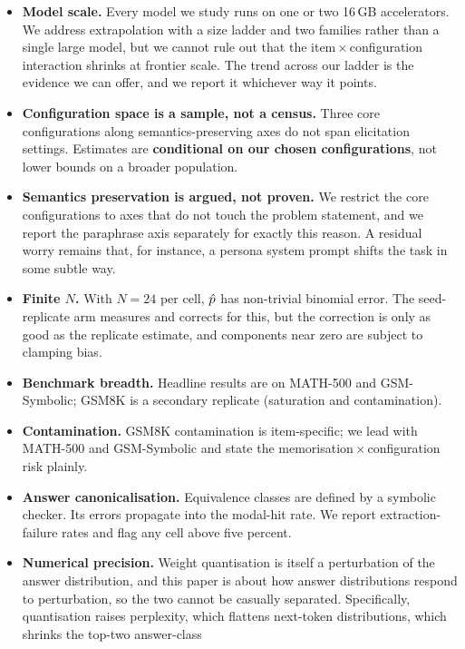 \begin{itemize}\itemsep2pt
  \item \textbf{Model scale.} Every model we study runs on one or two 16\,GB
    accelerators. We address extrapolation with a size ladder and two families
    rather than a single large model, but we cannot rule out that the
    item\,$\times$\,configuration interaction shrinks at frontier scale. The
    trend across our ladder is the evidence we can offer, and we report it
    whichever way it points.
  \item \textbf{Configuration space is a sample, not a census.} Three core
    configurations along semantics-preserving axes do not span elicitation settings. Estimates
    are \textbf{conditional on our chosen configurations}, not lower bounds on a
    broader population.
  \item \textbf{Semantics preservation is argued, not proven.} We restrict the
    core configurations to axes that do not touch the problem statement, and we
    report the paraphrase axis separately for exactly this reason. A residual
    worry remains that, for instance, a persona system prompt shifts the task
    in some subtle way.
  \item \textbf{Finite $N$.} With $N{=}24$ per cell, $\hat{p}$ has non-trivial
    binomial error. The seed-replicate arm measures and corrects for this, but
    the correction is only as good as the replicate estimate, and components
    near zero are subject to clamping bias.
  \item \textbf{Benchmark breadth.} Headline results are on MATH-500 and
    GSM-Symbolic; GSM8K is a secondary replicate (saturation and contamination).
  \item \textbf{Contamination.} GSM8K contamination is item-specific; we lead
    with MATH-500 and GSM-Symbolic and state the memorisation\,$\times$\,configuration
    risk plainly.
  \item \textbf{Answer canonicalisation.} Equivalence classes are defined by a
    symbolic checker. Its errors propagate into the modal-hit rate. We report
    extraction-failure rates and flag any cell above five percent.
  \item \textbf{Numerical precision.} Weight quantisation is itself a
    perturbation of the answer distribution, and this paper is about how
    answer distributions respond to perturbation, so the two cannot be
    casually separated. Specifically, quantisation raises perplexity, which
    flattens next-token distributions, which shrinks the top-two answer-class

\end{itemize}
